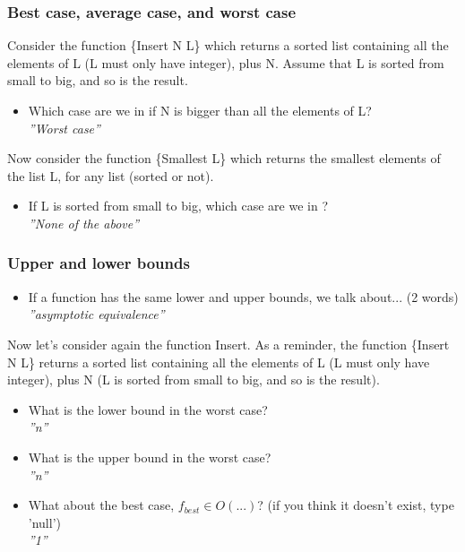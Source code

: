 \documentclass[fr,license=none]{../../../eplsummary}
\begin{document}
			\subsubsection*{Best case, average case, and worst case}
				Consider the function \{Insert N L\} which returns a sorted list containing all the elements of L (L must only have integer), plus N. Assume that L is sorted from small to big, and so is the result.
				\begin{itemize}
					\item Which case are we in if N is bigger than all the elements of L?\\
						\textit{''Worst case''}
				\end{itemize}
					Now consider the function \{Smallest L\} which returns the smallest elements of the list L, for any list (sorted or not).
				\begin{itemize}
					\item If L is sorted from small to big, which case are we in ?\\
						\textit{''None of the above''}
				\end{itemize}
			\subsubsection*{Upper and lower bounds}
				\begin{itemize}
					\item If a function has the same lower and upper bounds, we talk about... (2 words)\\
						\textit{''asymptotic equivalence''}
				\end{itemize}
					Now let's consider again the function Insert. As a reminder, the function \{Insert N L\} returns a sorted list containing all the elements of L (L must only have integer), plus N (L is sorted from small to big, and so is the result).
				\begin{itemize}
					\item What is the lower bound in the worst case?\\
						\textit{''n''}
					\item What is the upper bound in the worst case?\\
						\textit{''n''}
					\item What about the best case, $f_{best} \in O(...)$? (if you think it doesn't exist, type 'null')\\
						\textit{''1''}
				\end{itemize}
\end{document}

